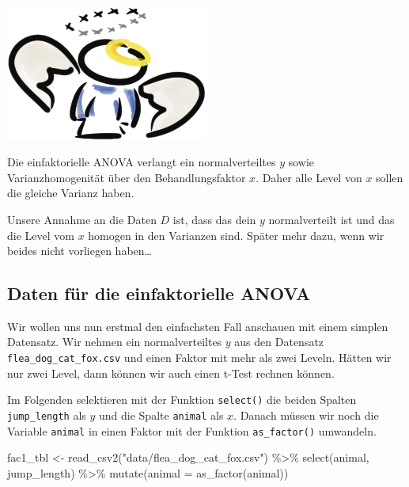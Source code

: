 \documentclass[
  letterpaper,
  DIV=11,
  oneside]{scrreport}
\newenvironment{Shaded}{\begin{snugshade}}{\end{snugshade}}
\newcommand{\AttributeTok}[1]{\textcolor[rgb]{0.40,0.45,0.13}{#1}}
\newcommand{\FunctionTok}[1]{\textcolor[rgb]{0.28,0.35,0.67}{#1}}
\newcommand{\NormalTok}[1]{\textcolor[rgb]{0.00,0.23,0.31}{#1}}
\newcommand{\OtherTok}[1]{\textcolor[rgb]{0.00,0.23,0.31}{#1}}
\newcommand{\SpecialCharTok}[1]{\textcolor[rgb]{0.37,0.37,0.37}{#1}}
\newcommand{\StringTok}[1]{\textcolor[rgb]{0.13,0.47,0.30}{#1}}
\begin{document}
\begin{marginfigure}

{\centering \includegraphics[width=0.5\textwidth,height=\textheight]{./images/angel_01.png}

}

\end{marginfigure}

Die einfaktorielle ANOVA verlangt ein normalverteiltes \(y\) sowie
Varianzhomogenität über den Behandlungsfaktor \(x\). Daher alle Level
von \(x\) sollen die gleiche Varianz haben.

Unsere Annahme an die Daten \(D\) ist, dass das dein \(y\)
normalverteilt ist und das die Level vom \(x\) homogen in den Varianzen
sind. Später mehr dazu, wenn wir beides nicht vorliegen haben\ldots{}

\hypertarget{daten-fuxfcr-die-einfaktorielle-anova}{%
\subsection{Daten für die einfaktorielle
ANOVA}\label{daten-fuxfcr-die-einfaktorielle-anova}}

Wir wollen uns nun erstmal den einfachsten Fall anschauen mit einem
simplen Datensatz. Wir nehmen ein normalverteiltes \(y\) aus den
Datensatz \texttt{flea\_dog\_cat\_fox.csv} und einen Faktor mit mehr als
zwei Leveln. Hätten wir nur zwei Level, dann können wir auch einen
t-Test rechnen können.

Im Folgenden selektieren mit der Funktion \texttt{select()} die beiden
Spalten \texttt{jump\_length} als \(y\) und die Spalte \texttt{animal}
als \(x\). Danach müssen wir noch die Variable \texttt{animal} in einen
Faktor mit der Funktion \texttt{as\_factor()} umwandeln.

\begin{Shaded}
\begin{Highlighting}[]
\NormalTok{fac1\_tbl }\OtherTok{\textless{}{-}} \FunctionTok{read\_csv2}\NormalTok{(}\StringTok{"data/flea\_dog\_cat\_fox.csv"}\NormalTok{) }\SpecialCharTok{\%\textgreater{}\%}
  \FunctionTok{select}\NormalTok{(animal, jump\_length) }\SpecialCharTok{\%\textgreater{}\%} 
  \FunctionTok{mutate}\NormalTok{(}\AttributeTok{animal =} \FunctionTok{as\_factor}\NormalTok{(animal))}
\end{Highlighting}
\end{Shaded}
\end{document}
